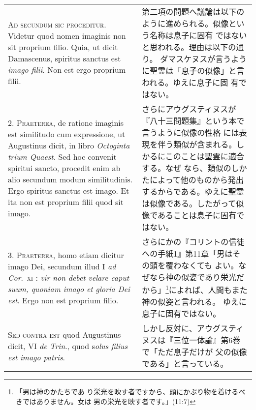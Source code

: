 \documentclass[10pt]{jsarticle} %
\begin{document}
\begin{longtable}{p{21em}p{21em}}
{\scshape Ad secundum sic proceditur}. Videtur quod nomen imaginis non sit
proprium filio. Quia, ut dicit Damascenus, spiritus sanctus est {\itshape imago
filii}. Non est ergo proprium filii.


&

第二項の問題へ議論は以下のように進められる。似像という名称は息子に固有
 ではないと思われる。理由は以下の通り。
ダマスケヌスが言うように聖霊は「息子の似像」と言われる。ゆえに息子に固
 有ではない。


\\



2. {\scshape Praeterea}, de ratione imaginis est similitudo cum expressione, ut
Augustinus dicit, in libro {\itshape Octoginta trium Quaest}. Sed hoc convenit
spiritui sancto, procedit enim ab alio secundum modum
similitudinis. Ergo spiritus sanctus est imago. Et ita non est
proprium filii quod sit imago.


&

さらにアウグスティヌスが『八十三問題集』という本で言うように似像の性格
 には表現を伴う類似が含まれる。しかるにこのことは聖霊に適合する。なぜ
 なら、類似のしかたによって他のものから発出するからである。ゆえに聖霊
 は似像である。したがって似像であることは息子に固有ではない。

\\



3. {\scshape Praeterea}, homo etiam dicitur imago Dei, secundum illud
 I {\itshape ad Cor}.~{\scshape xi} : 
{\itshape vir non debet velare caput suum, quoniam imago et gloria Dei est}. Ergo
non est proprium filio.


&

さらにかの『コリントの信徒への手紙1』第11章「男はその頭を覆わなくても
 よい。なぜなら神の似姿であり栄光だから」\footnote{「男は神のかたちであ
 り栄光を映す者ですから、頭にかぶり物を着けるべきではありません。女は
 男の栄光を映す者です。」(11:7)}によれば、人間もまた神の似姿と言われる。
 ゆえに息子に固有ではない。

\\



{\scshape Sed contra est} quod Augustinus dicit, VI {\itshape de Trin}., quod s{\itshape olus filius
est imago patris}.


&

しかし反対に、アウグスティヌスは『三位一体論』第6巻で「ただ息子だけが
 父の似像である」と言っている。
\\




\end{longtable}
\end{document}
